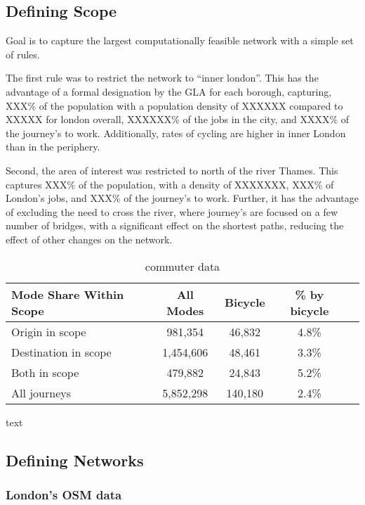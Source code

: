 \subsection{Defining Scope}


Goal is to capture the largest computationally feasible network with a simple set of rules. 

The first rule was to restrict the network to ``inner london''. This has the advantage of a formal designation by the GLA for each borough, capturing, XXX\% of the population with a population density of XXXXXX compared to XXXXX for london overall, XXXXXX\% of the jobs in the city, and XXXX\% of the journey's to work. Additionally, rates of cycling are higher in inner London than in the periphery. 

Second, the area of interest was restricted to north of the river Thames. This captures XXX\% of the population, with a density of XXXXXXX, XXX\% of London's jobs, and XXX\% of the journey's to work. Further, it has the advantage of excluding the need to cross the river, where journey's are focused on a few number of bridges, with a significant effect on the shortest paths, reducing the effect of other changes on the network. 

\begin{table}[]
\centering
\begin{tabular}{lcccl}
 Mode Share Within Scope & All Modes & Bicycle & \% by bicycle &  \\
 \hline
 Origin in scope &  981,354 & 46,832 & 4.8\% &  \\
 Destination in scope & 1,454,606 & 48,461 & 3.3\% &  \\
 Both in scope & 479,882 & 24,843 & 5.2\% & \\
 All journeys & 5,852,298 & 140,180 & 2.4\% \\ 
\end{tabular}
\caption{commuter data}
\label{table:commute_data}
\end{table}

text

\subsection{Defining Networks}


\subsubsection{London's OSM data}

